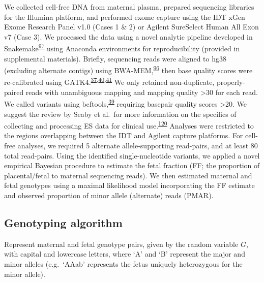 \documentclass[11pt,letterpaper]{book}
\begin{document}
We collected cell-free DNA from maternal plasma, prepared sequencing libraries for the Illumina platform, and performed exome capture using the IDT xGen Exome Research Panel v1.0 (Cases 1 \& 2) or Agilent SureSelect Human All Exon v7 (Case 3).
We processed the data using a novel analytic pipeline developed in Snakemake\textsuperscript{\protect\hyperlink{ref-koster:2012aa}{97}} using Anaconda environments for reproducibility (provided in supplemental materials).
Briefly, sequencing reads were aligned to hg38 (excluding alternate contigs) using BWA-MEM,\textsuperscript{\protect\hyperlink{ref-li:2013ab}{96}} then base quality scores were re-calibrated using GATK4.\textsuperscript{\protect\hyperlink{ref-mckenna:2010aa}{37},\protect\hyperlink{ref-van-der-auwera:2013aa}{40},\protect\hyperlink{ref-poplin:2018aa}{41}}
We only retained non-duplicate, properly-paired reads with unambiguous mapping and mapping quality \textgreater30 for each read.
We called variants using bcftools,\textsuperscript{\protect\hyperlink{ref-li:2011aa}{39}} requiring basepair quality scores \textgreater20.
We suggest the review by Seaby et al.~for more information on the specifics of collecting and processing ES data for clinical use.\textsuperscript{\protect\hyperlink{ref-seaby:2016aa}{120}}
Analyses were restricted to the regions overlapping between the IDT and Agilent capture platforms.
For cell-free analyses, we required 5 alternate allele-supporting read-pairs, and at least 80 total read-pairs.
Using the identified single-nucleotide variants, we applied a novel empirical Bayesian procedure to estimate the fetal fraction (FF; the proportion of placental/fetal to maternal sequencing reads).
We then estimated maternal and fetal genotypes using a maximal likelihood model incorporating the FF estimate and observed proportion of minor allele (alternate) reads (PMAR).

\hypertarget{genotyping-algorithm}{%
\subsection{Genotyping algorithm}\label{genotyping-algorithm}}

\newcommand{\Var}[2][]{\text{Var}_{#1}\left(#2\right)}
\newcommand\I[1]{\text{I}\left(#1\right)}

Represent maternal and fetal genotype pairs, given by the random variable \(G\), with capital and lowercase letters, where `A' and `B' represent the major and minor alleles (e.g.~`AAab' represents the fetus uniquely heterozygous for the minor allele).
\end{document}
